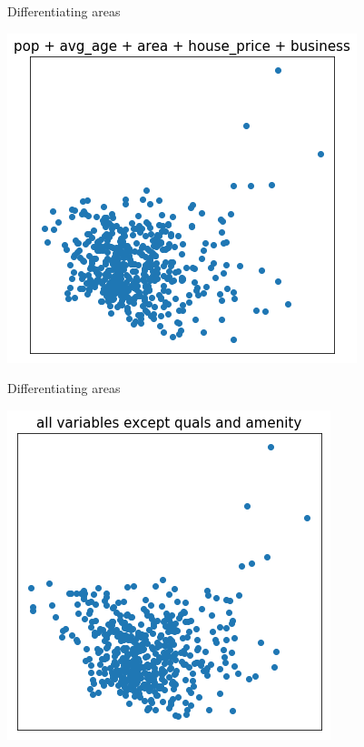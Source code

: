 \documentclass{beamer}
\begin{document}
\begin{frame}{Differentiating areas}
  \begin{center}
    \includegraphics[scale=.40]{../gfx/cluster3.png}
  \end{center}
\end{frame}

\begin{frame}{Differentiating areas}
  \begin{center}
    \includegraphics[scale=.40]{../gfx/cluster4.png}
  \end{center}
\end{frame}
\end{document}
